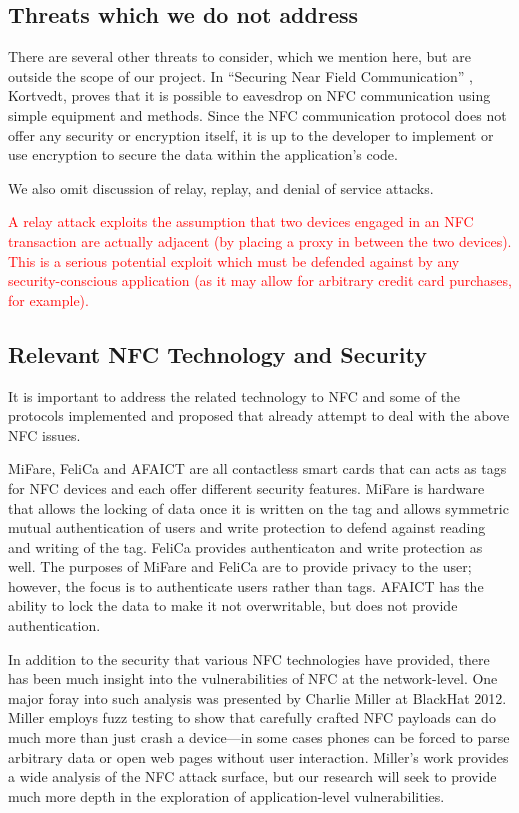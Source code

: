 \documentclass[12pt]{article}
\newcommand\TODO[1]{\textcolor{red}{#1}}
\begin{document}
\subsection{Threats which we do not address}
There are several other threats to consider, which we mention here, but are outside the scope of our project.
In ``Securing Near Field Communication'' \cite{kortvedt2009}, Kortvedt, proves that it is possible to eavesdrop on NFC communication using simple equipment and methods.
Since the NFC communication protocol does not offer any security or encryption itself, it is up to the developer to implement or use encryption to secure the data within the application's code. 

We also omit discussion of relay, replay, and denial of service attacks.

\TODO{A relay attack exploits the assumption that two devices engaged in an NFC transaction are actually adjacent (by placing a proxy in between the two devices).
This is a serious potential exploit which must be defended against by any security-conscious application (as it may allow for arbitrary credit card purchases, for example).}

\subsection{Relevant NFC Technology and Security}
It is important to address the related technology to NFC and some of the protocols implemented and proposed that already attempt to deal with the above NFC issues. 

MiFare, FeliCa and AFAICT are all contactless smart cards that can acts as tags for NFC devices and each offer different security features. MiFare is hardware that allows the locking of data once it is written on the tag and allows symmetric mutual authentication of users and write protection to defend against reading and writing of the tag. FeliCa provides authenticaton and write protection as well. The purposes of MiFare and FeliCa are to provide privacy to the user; however, the focus is to authenticate users rather than tags. AFAICT has the ability to lock the data to make it not overwritable, but does not provide authentication. 

In addition to the security that various NFC technologies have provided, there has been much insight into the vulnerabilities of NFC at the network-level. 
One major foray into such analysis was presented by Charlie Miller at BlackHat 2012\cite{miller2012}.
Miller employs fuzz testing to show that carefully crafted NFC payloads can do much more than just crash a device---in some cases phones can be forced to parse arbitrary data or open web pages without user interaction.
Miller's work provides a wide analysis of the NFC attack surface, but our research will seek to provide much more depth in the exploration of application-level vulnerabilities.
\end{document}
